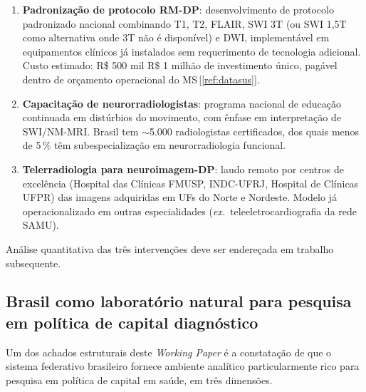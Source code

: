 \documentclass[12pt,a4paper,oneside]{article}
\begin{document}
\begin{enumerate}
\item \textbf{Padronização de protocolo RM-DP}: desenvolvimento de
protocolo padronizado nacional combinando T1, T2, FLAIR, SWI 3T
(ou SWI 1,5T como alternativa onde 3T não é disponível) e DWI,
implementável em equipamentos clínicos já instalados sem
requerimento de tecnologia adicional. Custo estimado: R\$ 500 mil
\textendash{} R\$ 1 milhão de investimento único, pagável dentro
de orçamento operacional do MS\,[\ref{ref:datasus}].
\item \textbf{Capacitação de neurorradiologistas}: programa
nacional de educação continuada em distúrbios do movimento, com
ênfase em interpretação de SWI/NM-MRI. Brasil tem
$\sim$5.000 radiologistas certificados, dos quais menos de 5\,\%
têm subespecialização em neurorradiologia funcional.
\item \textbf{Telerradiologia para neuroimagem-DP}: laudo remoto por
centros de excelência (Hospital das Clínicas FMUSP, INDC-UFRJ,
Hospital de Clínicas UFPR) das imagens adquiridas em UFs do Norte
e Nordeste. Modelo já operacionalizado em outras especialidades
(\textit{ex.}\ teleeletrocardiografia da rede SAMU).
\end{enumerate}

Análise quantitativa das três intervenções deve ser endereçada em
trabalho subsequente.

\subsection{Brasil como laboratório natural para pesquisa em
política de capital diagnóstico}\label{subsec:laboratorio-natural}

Um dos achados estruturais deste \textit{Working Paper} é a
constatação de que o sistema federativo brasileiro fornece
ambiente analítico particularmente rico para pesquisa em política
de capital em saúde, em três dimensões.
\end{document}
